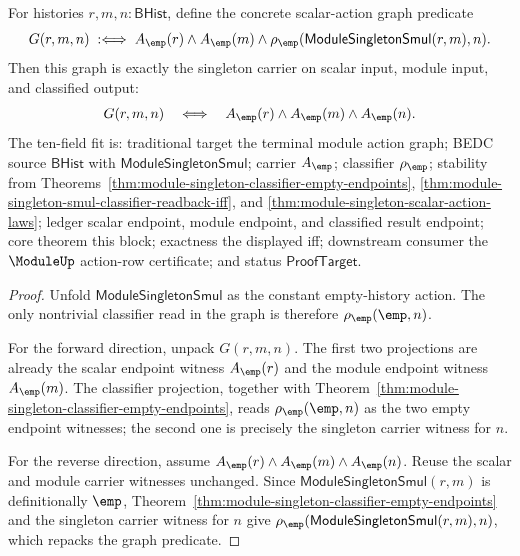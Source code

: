 \begin{theorem}
\label{thm:module-singleton-smul-graph-exact}
For histories $r,m,n:\mathsf{BHist}$, define the concrete scalar-action graph
predicate
$$
G(r,m,n)\;:\Longleftrightarrow\;
A_{\emp}(r)\land A_{\emp}(m)\land
\rho_{\emp}(\mathsf{ModuleSingletonSmul}(r,m),n).
$$
Then this graph is exactly the singleton carrier on scalar input, module input,
and classified output:
$$
G(r,m,n)\quad\Longleftrightarrow\quad
A_{\emp}(r)\land A_{\emp}(m)\land A_{\emp}(n).
$$
The ten-field fit is: traditional target the terminal module action graph;
BEDC source $\mathsf{BHist}$ with $\mathsf{ModuleSingletonSmul}$; carrier
$A_{\emp}$; classifier $\rho_{\emp}$; stability from
Theorems~\ref{thm:module-singleton-classifier-empty-endpoints},
\ref{thm:module-singleton-smul-classifier-readback-iff}, and
\ref{thm:module-singleton-scalar-action-laws}; ledger scalar endpoint, module
endpoint, and classified result endpoint; core theorem this block; exactness
the displayed iff; downstream consumer the $\ModuleUp$ action-row certificate;
and status $\mathsf{ProofTarget}$.
\end{theorem}
\begin{proof}
Unfold $\mathsf{ModuleSingletonSmul}$ as the constant empty-history action.
The only nontrivial classifier read in the graph is therefore
$\rho_{\emp}(\emp,n)$.

For the forward direction, unpack $G(r,m,n)$. The first two projections are
already the scalar endpoint witness $A_{\emp}(r)$ and the module endpoint
witness $A_{\emp}(m)$. The classifier projection, together with
Theorem~\ref{thm:module-singleton-classifier-empty-endpoints}, reads
$\rho_{\emp}(\emp,n)$ as the two empty endpoint witnesses; the second one is
precisely the singleton carrier witness for $n$.

For the reverse direction, assume
$A_{\emp}(r)\land A_{\emp}(m)\land A_{\emp}(n)$. Reuse the scalar and module
carrier witnesses unchanged. Since
$\mathsf{ModuleSingletonSmul}(r,m)$ is definitionally $\emp$,
Theorem~\ref{thm:module-singleton-classifier-empty-endpoints} and the
singleton carrier witness for $n$ give
$\rho_{\emp}(\mathsf{ModuleSingletonSmul}(r,m),n)$, which repacks the graph
predicate.
\end{proof}

